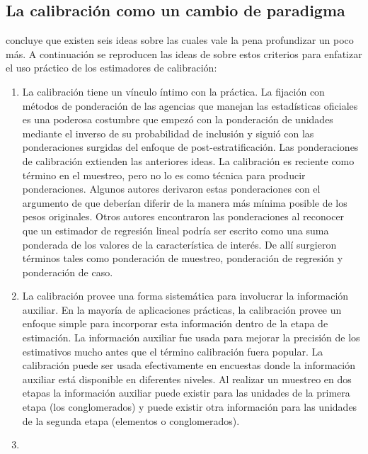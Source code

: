 \documentclass[
  10pt,
  spanish,
]{book}
\begin{document}
\hypertarget{la-calibraciuxf3n-como-un-cambio-de-paradigma}{%
\subsection{La calibración como un cambio de paradigma}\label{la-calibraciuxf3n-como-un-cambio-de-paradigma}}

\citet{Sar08} concluye que existen seis ideas sobre las cuales vale la pena profundizar un poco más. A continuación se reproducen las ideas de \citet{Gutierrez_2016} sobre estos criterios para enfatizar el uso práctico de los estimadores de calibración:

\begin{enumerate}
\def\labelenumi{\arabic{enumi}.}
\item
  La calibración tiene un vínculo íntimo con la práctica. La fijación con métodos de ponderación de las agencias que manejan las estadísticas oficiales es una poderosa costumbre que empezó con la ponderación de unidades mediante el inverso de su probabilidad de inclusión y siguió con las ponderaciones surgidas del enfoque de post-estratificación. Las ponderaciones de calibración extienden las anteriores ideas. La calibración es reciente como término en el muestreo, pero no lo es como técnica para producir ponderaciones. Algunos autores derivaron estas ponderaciones con el argumento de que deberían diferir de la manera más mínima posible de los pesos originales. Otros autores encontraron las ponderaciones al reconocer que un estimador de regresión lineal podría ser escrito como una suma ponderada de los valores de la característica de interés. De allí surgieron términos tales como ponderación de muestreo, ponderación de regresión y ponderación de caso.
\item
  La calibración provee una forma sistemática para involucrar la información auxiliar. En la mayoría de aplicaciones prácticas, la calibración provee un enfoque simple para incorporar esta información dentro de la etapa de estimación. La información auxiliar fue usada para mejorar la precisión de los estimativos mucho antes que el término calibración fuera popular. La calibración puede ser usada efectivamente en encuestas donde la información auxiliar está disponible en diferentes niveles. Al realizar un muestreo en dos etapas la información auxiliar puede existir para las unidades de la primera etapa (los conglomerados) y puede existir otra información para las unidades de la segunda etapa (elementos o conglomerados).
\item

\end{enumerate}
\end{document}
